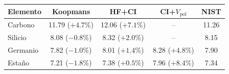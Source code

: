 \begin{tabular}{lcccc}
    \toprule
    \textbf{Elemento} & \textbf{Koopmans} & \textbf{HF+CI} & \textbf{CI+$V_{\text{pol}}$} & \textbf{NIST} \\
    \midrule
    Carbono & 11.79 ($+4.7$\%) & 12.06 ($+7.1$\%) & -- & 11.26 \\
    Silicio & 8.08 ($-0.8$\%) & 8.32 ($+2.0$\%) & -- & 8.15 \\
    Germanio & 7.82 ($-1.0$\%) & 8.01 ($+1.4$\%) & 8.28 ($+4.8$\%) & 7.90 \\
    Estaño & 7.21 ($-1.8$\%) & 7.38 ($+0.5$\%) & 7.96 ($+8.4$\%) & 7.34 \\
    \bottomrule
\end{tabular}

